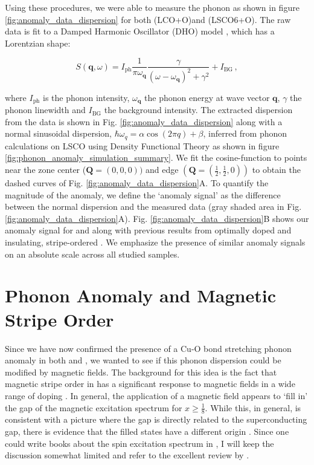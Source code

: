 Using these procedures, we were able to measure the phonon as shown in figure \ref{fig:anomaly_data_dispersion} for both \LCOO{} (LCO+O)and \LSCOOsix{} (LSCO6+O). The raw data is fit to a Damped Harmonic Oscillator (DHO) model \cite{Fak1997}, which has a Lorentzian shape:

\begin{equation}
    S(\bm{q},\omega) = I_\text{ph} \frac{1}{\pi \omega_{\bm{q}}} \frac{\gamma}{(\omega - \omega_{\bm{q}})^2 + \gamma^2} + I_\text{BG} \, ,
\end{equation}

\noindent where $I_\text{ph}$ is the phonon intensity, $\omega_{\bm{q}}$ the phonon energy at wave vector $\bm{q}$, $\gamma$ the phonon linewidth and $I_\text{BG}$ the background intensity. The extracted dispersion from the data is shown in Fig. \ref{fig:anomaly_data_dispersion} along with a normal sinusoidal dispersion, $\hbar\omega_q=\alpha \cos(2 \pi q) + \beta$, inferred from phonon calculations on LSCO using Density Functional Theory as shown in figure \ref{fig:phonon_anomaly_simulation_summary}. We fit the cosine-function to points near the zone center ($\bm{Q}=(0,0,0))$ and edge $(\bm{Q}=(\frac{1}{2},\frac{1}{2},0))$ to obtain the dashed curves of Fig. \ref{fig:anomaly_data_dispersion}A. To quantify the magnitude of the anomaly, we define the `anomaly signal' as the difference between the normal dispersion and the measured data (gray shaded area in Fig. \ref{fig:anomaly_data_dispersion}A). Fig. \ref{fig:anomaly_data_dispersion}B shows our anomaly signal for \LCOO{} and \LSCOOsix{} along with previous results from optimally doped \LSCOopt{} and insulating, stripe-ordered \LNSCO{} \cite{Reznik2007}. We emphasize the presence of similar anomaly signals on an absolute scale across all studied samples.

\section{Phonon Anomaly and Magnetic Stripe Order}
Since we have now confirmed the presence of a Cu-O bond stretching phonon anomaly in both \LCOO{} and \LSCOOsix{}, we wanted to see if this phonon dispersion could be modified by magnetic fields. The background for this idea is the fact that magnetic stripe order in \LSCO{} has a significant response to magnetic fields in a wide range of doping \cite{Chang2008,Kofu2009,Romer2013,Tranquada2004,Lake2001}. In general, the application of a magnetic field appears to `fill in' the gap of the magnetic excitation spectrum for $x \geq \frac{1}{8}$. While this, in general, is consistent with a picture where the gap is directly related to the superconducting gap, there is evidence that the filled states have a different origin \cite{Kofu2009}. Since one could write books about the spin excitation spectrum in \LSCO{}, I will keep the discussion somewhat limited and refer to the excellent review by \citeauthor{Tranquada2013} \cite{Tranquada2013}.

